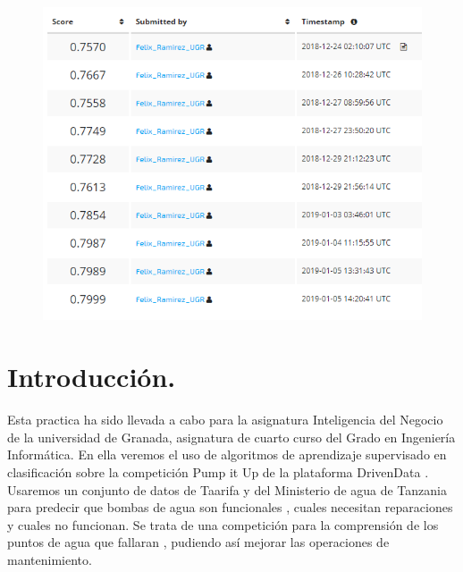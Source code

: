 	\newpage %
	
	\begin{figure}[htb]
		\centering
		\includegraphics[width=1.0\textwidth]{./imagenes/5}
		\label{fig:1}
	\end{figure}
	
	\newpage %
	
	\tableofcontents %
	
	\listoffigures %
	
	\listoftables %
	
	\newpage

	
	\section[Introducción]{Introducción.}
	
	Esta practica ha sido llevada a cabo para la asignatura Inteligencia del Negocio de la universidad de Granada, asignatura de cuarto curso del Grado en Ingeniería Informática. En ella veremos el uso de algoritmos de aprendizaje supervisado en clasificación sobre la competición Pump it Up de la plataforma DrivenData . Usaremos un conjunto de datos de Taarifa y del Ministerio de agua de Tanzania para predecir que bombas de agua son funcionales , cuales necesitan reparaciones y cuales no funcionan. Se trata de una competición para la comprensión de los puntos de agua que fallaran , pudiendo así mejorar las operaciones de mantenimiento. \\
	
